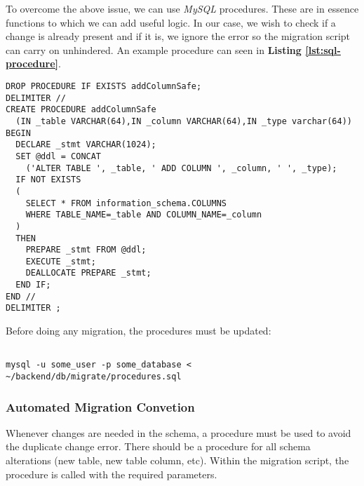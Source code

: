 To overcome the above issue, we can use \textit{MySQL} procedures. These are in essence functions to which we can add useful logic. In our case, we wish to check if a change is already present and if it is, we ignore the error so the migration script can carry on unhindered. An example procedure can seen in \textbf{Listing \ref{lst:sql-procedure}}.

\begin{listing}[H]
\begin{verbatim}
DROP PROCEDURE IF EXISTS addColumnSafe;
DELIMITER //
CREATE PROCEDURE addColumnSafe
  (IN _table VARCHAR(64),IN _column VARCHAR(64),IN _type varchar(64))
BEGIN
  DECLARE _stmt VARCHAR(1024);
  SET @ddl = CONCAT
    ('ALTER TABLE ', _table, ' ADD COLUMN ', _column, ' ', _type);
  IF NOT EXISTS
  (
    SELECT * FROM information_schema.COLUMNS
    WHERE TABLE_NAME=_table AND COLUMN_NAME=_column
  )
  THEN
    PREPARE _stmt FROM @ddl;
    EXECUTE _stmt;
    DEALLOCATE PREPARE _stmt;
  END IF;
END //
DELIMITER ;
\end{verbatim}
\label{lst:sql-procedure}
\end{listing}

Before doing any migration, the procedures must be updated:

\begin{listing}[H]
\begin{verbatim}

mysql -u some_user -p some_database < ~/backend/db/migrate/procedures.sql

\end{verbatim}
\label{lst:updating-sql-procedures}
\end{listing}

\subsubsection{Automated Migration Convetion}
\label{subsubsec:automated-migration-convention}

Whenever changes are needed in the schema, a procedure must be used to avoid the duplicate change error. There should be a procedure for all schema alterations (new table, new table column, etc). Within the migration script, the procedure is called with the required parameters.

